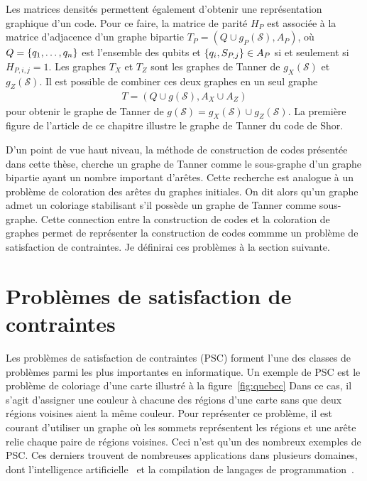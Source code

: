 Les matrices densités permettent également d'obtenir une représentation graphique d'un code.
Pour ce faire, la matrice de parité $H_P$ est associée à la matrice d'adjacence d'un
graphe bipartie $T_P = (Q \cup g_P(\mathcal S), A_P)$,
où $Q = \qty{q_1, \dots, q_n}$ est l'ensemble des qubits
et $\qty{q_i, S_{P, j}} \in A_P$ si et seulement si $H_{P, i, j} = 1$.
Les graphes $T_X$ et $T_Z$ sont les graphes de Tanner de $g_X(\mathcal S)$ et $g_Z(\mathcal S)$.
Il est possible de combiner ces deux graphes en un seul graphe
\begin{align}
  T = (Q \cup g(\mathcal S), A_X \cup A_Z)
\end{align}
pour obtenir le graphe de Tanner de $g(\mathcal S) = g_X(\mathcal S) \cup g_Z(\mathcal S)$.
La première figure de l'article de ce chapitre illustre le graphe de Tanner du code de Shor.

D'un point de vue haut niveau,
la méthode de construction de codes présentée dans cette thèse,
cherche un graphe de Tanner comme le sous-graphe d'un graphe bipartie
ayant un nombre important d'arêtes.
Cette recherche est analogue à un problème de coloration des arêtes du graphes initiales.
On dit alors qu'un graphe admet un coloriage stabilisant s'il possède un graphe de Tanner comme sous-graphe.
Cette connection entre la construction de codes et la coloration de graphes permet 
de représenter la construction de codes commme un problème de satisfaction de contraintes.
Je définirai ces problèmes à la section suivante.

\section{Problèmes de satisfaction de contraintes}
\label{sec:csp}

Les problèmes de satisfaction de contraintes (PSC)
forment l'une des classes de problèmes parmi les plus importantes en informatique.
Un exemple de PSC est le problème de coloriage d'une carte illustré à la figure~\ref{fig:quebec}
Dans ce cas,
il s'agit d'assigner une couleur à chacune des régions d'une carte sans que deux régions voisines 
aient la même couleur.
Pour représenter ce problème,
il est courant d'utiliser un graphe où les sommets représentent les régions et une arête relie
chaque paire de régions voisines.
Ceci n'est qu'un des nombreux exemples de PSC.
Ces derniers trouvent de nombreuses applications dans plusieurs domaines,
dont l'intelligence artificielle~\cite{russel_artificial_nodate}
et la compilation de langages de programmation~\cite{aho_compilers_2006}.

